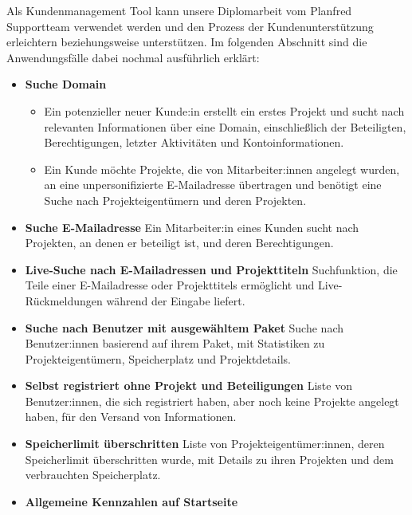 Als Kundenmanagement Tool kann unsere Diplomarbeit vom Planfred Supportteam verwendet werden und den Prozess der Kundenunterstützung erleichtern beziehungsweise unterstützen.
Im folgenden Abschnitt sind die Anwendungsfälle dabei nochmal ausführlich erklärt:

\begin{itemize}
    \item \textbf{Suche Domain}
        \begin{itemize}
            \item Ein potenzieller neuer Kunde:in erstellt ein erstes Projekt und sucht nach relevanten Informationen über eine Domain, einschließlich der Beteiligten, Berechtigungen, letzter Aktivitäten und Kontoinformationen.
            \item  Ein Kunde möchte Projekte, die von Mitarbeiter:innen angelegt wurden, an eine unpersonifizierte E-Mailadresse übertragen und benötigt eine Suche nach Projekteigentümern und deren Projekten.
        \end{itemize}
    \item \textbf{Suche E-Mailadresse}
        \newline
        Ein Mitarbeiter:in eines Kunden sucht nach Projekten, an denen er beteiligt ist, und deren Berechtigungen.
    \item \textbf{Live-Suche nach E-Mailadressen und Projekttiteln}
        \newline
        Suchfunktion, die Teile einer E-Mailadresse oder Projekttitels ermöglicht und Live-Rückmeldungen während der Eingabe liefert.
    \item \textbf{Suche nach Benutzer mit ausgewähltem Paket}
        \newline
        Suche nach Benutzer:innen basierend auf ihrem Paket, mit Statistiken zu Projekteigentümern, Speicherplatz und Projektdetails.
    \item \textbf{Selbst registriert ohne Projekt und Beteiligungen}
        \newline
        Liste von Benutzer:innen, die sich registriert haben, aber noch keine Projekte angelegt haben, für den Versand von Informationen.
    \item \textbf{Speicherlimit überschritten}
        \newline
        Liste von Projekteigentümer:innen, deren Speicherlimit überschritten wurde, mit Details zu ihren Projekten und dem verbrauchten Speicherplatz.
    \item \textbf{Allgemeine Kennzahlen auf Startseite}

\end{itemize}
